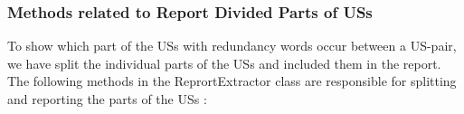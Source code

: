 \subsubsection*{Methods related to Report Divided Parts of USs}
To show which part of the USs with redundancy words occur between a US-pair, we have split the individual parts of the USs and included them in the report.
The following methods in the ReprortExtractor class are responsible for splitting and reporting the parts of the USs :
